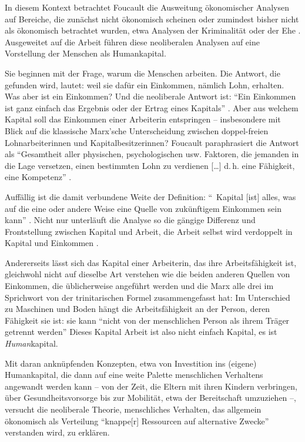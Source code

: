 \documentclass[12pt,
               DIV13,
               paper=a4,
               twoside=false,
               onehalfspacing,
               bibliography=totoc,
               toc=graduated,
               draft,
               ]{scrartcl}
\newcommand{\lips}{\dots\unkern}
\newcommand{\pc}[2]{\parencite[#1]{#2}}
\newcommand{\vgl}[2]{\parencite[vgl.][#1]{#2}}
\newcommand{\worries}[1]{\ifdraft{\textcolor{blue}{\texttt{(#1)}}}{}}
\begin{document}
In diesem Kontext betrachtet Foucault die Ausweitung ökonomischer
Analysen auf Bereiche, die zunächst nicht ökonomisch scheinen oder
zumindest bisher nicht als ökonomisch betrachtet wurden, etwa Analysen
der Kriminalität oder der Ehe \vgl{367}{gbp}. Ausgeweitet auf 
die Arbeit führen diese neoliberalen Analysen auf eine Vorstellung der
Menschen als Humankapital.

Sie beginnen mit der Frage, warum die Menschen arbeiten. Die Antwort,
die gefunden wird, lautet: weil sie dafür ein Einkommen, nämlich Lohn,
erhalten. Was aber ist ein Einkommen? Und die neoliberale Antwort ist:
"`Ein Einkommen ist ganz einfach das Ergebnis oder der Ertrag eines
Kapitals"' \pc{S. 311 f.}{gbp}. Aber aus welchem Kapital soll das
Einkommen einer Arbeiterin entspringen -- insbesondere mit Blick auf die
klassische Marx'sche Unterscheidung zwischen doppel-freien
Lohnarbeiterinnen und Kapitalbesitzerinnen? Foucault paraphrasiert die
Antwort als "`Gesamtheit aller physischen, psychologischen usw.
Faktoren, die jemanden in die Lage versetzen, einen bestimmten Lohn zu
verdienen [\lips] d.\,h. eine Fähigkeit, eine Kompetenz"' \pc{312}{gbp}.

Auffällig ist die damit verbundene Weite der Definition: "`\,\glq
Kapital\grq{} [ist] alles, was auf die eine oder andere Weise eine
Quelle von zukünftigem Einkommen sein kann"' \pc{312}{gbp}. Nicht nur
unterläuft die Analyse so die gängige Differenz und Frontstellung
zwischen Kapital und Arbeit, die Arbeit selbst wird verdoppelt in
Kapital und Einkommen \vgl{312}{gbp}.

Andererseits lässt sich das Kapital einer Arbeiterin, das ihre
Arbeitsfähigkeit ist, gleichwohl nicht auf dieselbe Art verstehen wie
die beiden anderen Quellen von Einkommen, die üblicherweise angeführt
werden und die Marx alle drei im Sprichwort von der trinitarischen
Formel \vgl{Kapitel 48, S. 822-839}{kap3} \worries{?} zusammengefasst
hat: Im Unterschied zu Maschinen und Boden hängt die Arbeitsfähigkeit
an der Person, deren Fähigkeit sie ist: sie kann "`nicht von der
menschlichen Person als ihrem Träger getrennt werden"' \pc{315}.
Dieses Kapital Arbeit ist also nicht einfach Kapital, es ist
\emph{Human}kapital.

Mit daran anknüpfenden Konzepten, etwa von Investition ins (eigene)
Humankapital, die dann auf eine weite Palette menschlichen Verhaltens
angewandt werden kann -- von der Zeit, die Eltern mit ihren Kindern
verbringen, über Gesundheitsvorsorge bis zur Mobilität, etwa der
Bereitschaft umzuziehen \vgl{320}{gbp} --, versucht die neoliberale
Theorie, menschliches Verhalten, das allgemein ökonomisch als
Verteilung "`knappe[r] Ressourcen auf alternative Zwecke"'
\pc{310}{gbp} verstanden wird, zu erklären.
\end{document}
